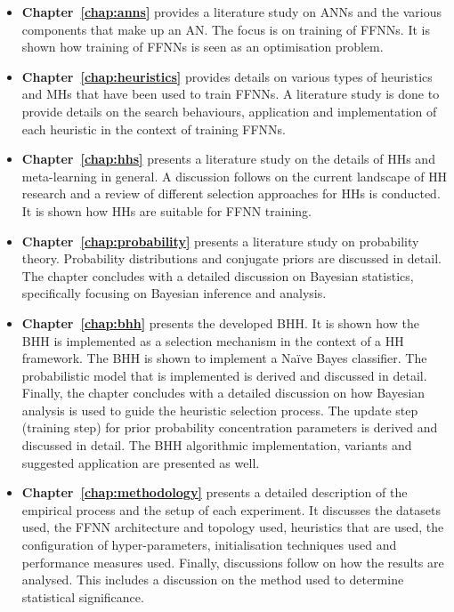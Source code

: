 \begin{itemize}
      \item \textbf{Chapter~\ref{chap:anns}} provides a literature study on \acp{ANN} and the various components that make up an \acf{AN}. The focus is on training of \acp{FFNN}. It is shown how training of \acp{FFNN} is seen as an optimisation problem.

      \item \textbf{Chapter~\ref{chap:heuristics}} provides details on various types of heuristics and \acp{MH} that have been used to train \acp{FFNN}. A literature study is done to provide details on the search behaviours, application and implementation of each heuristic in the context of training \acp{FFNN}.

      \item \textbf{Chapter~\ref{chap:hhs}} presents a literature study on the details of \acp{HH} and meta-learning in general. A discussion follows on the current landscape of \acs{HH} research and a review of different selection approaches for \acp{HH} is conducted. It is shown how \acp{HH} are suitable for \acs{FFNN} training.

      \item \textbf{Chapter~\ref{chap:probability}} presents a literature study on probability theory. Probability distributions and conjugate priors are discussed in detail. The chapter concludes with a detailed discussion on Bayesian statistics, specifically focusing on Bayesian inference and analysis.

      \item \textbf{Chapter~\ref{chap:bhh}} presents the developed \Acs{BHH}. It is shown how the \Acs{BHH} is implemented as a selection mechanism in the context of a \acs{HH} framework. The \Acs{BHH} is shown to implement a Na\"ive Bayes classifier. The probabilistic model that is implemented is derived and discussed in detail. Finally, the chapter concludes with a detailed discussion on how Bayesian analysis is used to guide the heuristic selection process. The update step (training step) for prior probability concentration parameters is derived and discussed in detail. The \Acs{BHH} algorithmic implementation, variants and suggested application are presented as well.

      \item \textbf{Chapter~\ref{chap:methodology}} presents a detailed description of the empirical process and the setup of each experiment. It discusses the datasets used, the \acs{FFNN} architecture and topology used, heuristics that are used, the configuration of hyper-parameters, initialisation techniques used and performance measures used.  Finally, discussions follow on how the results are analysed. This includes a discussion on the method used to determine statistical significance.


\end{itemize}
